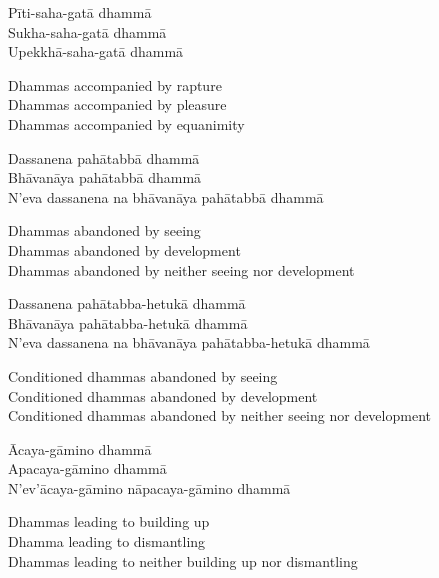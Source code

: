 \begin{pali-hang-continued}
Pīti-saha-gatā dhammā\\
Sukha-saha-gatā dhammā\\
Upekkhā-saha-gatā dhammā
\end{pali-hang-continued}

\begin{english-verses}
  Dhammas accompanied by rapture\\
  Dhammas accompanied by pleasure\\
  Dhammas accompanied by equanimity
\end{english-verses}

\begin{pali-hang-continued}
Dassanena pahātabbā dhammā\\
Bhāvanāya pahātabbā dhammā\\
N'eva dassanena na bhāvanāya pahātabbā dhammā
\end{pali-hang-continued}

\begin{english-verses}
  Dhammas abandoned by seeing\\
  Dhammas abandoned by development\\
  Dhammas abandoned by neither seeing nor development
\end{english-verses}

\begin{pali-hang-continued}
Dassanena pahātabba-hetukā dhammā\\
Bhāvanāya pahātabba-hetukā dhammā\\
N'eva dassanena na bhāvanāya pahātabba-hetukā dhammā
\end{pali-hang-continued}

\begin{english-verses}
  Conditioned dhammas abandoned by seeing\\
  Conditioned dhammas abandoned by development\\
  Conditioned dhammas abandoned by neither seeing nor development
\end{english-verses}

\begin{pali-hang-continued}
Ācaya-gāmino dhammā\\
Apacaya-gāmino dhammā\\
N'ev'ācaya-gāmino nāpacaya-gāmino dhammā
\end{pali-hang-continued}

\begin{english-verses}
  Dhammas leading to building up\\
  Dhamma leading to dismantling\\
  Dhammas leading to neither building up nor dismantling
\end{english-verses}

